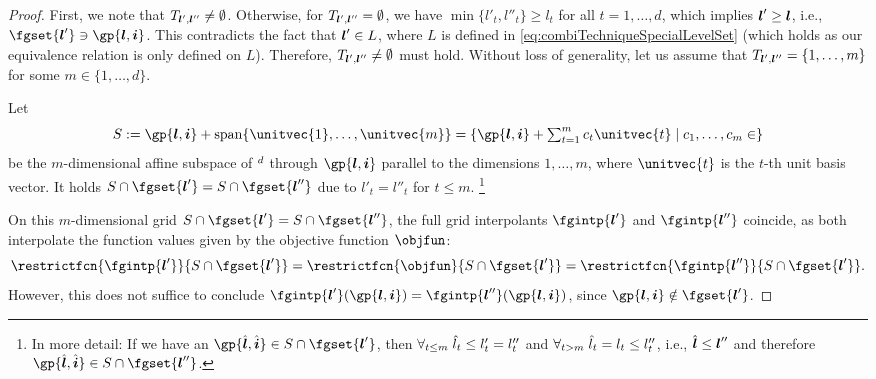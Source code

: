 \begin{proof}
  First, we note that $T_{{\boldsymbol{l}}',{\boldsymbol{l}}''} \not= \emptyset$.
  Otherwise, for $T_{{\boldsymbol{l}}',{\boldsymbol{l}}''} = \emptyset$,
  we have $\min\{l'_t, l''_t\} \ge l_t$
  for all $t = 1, \dotsc, d$, which implies ${\boldsymbol{l}}' \ge {\boldsymbol{l}}$, i.e.,
  $\fgset{\*l'} \ni \gp{\*l,\*i}$.
  This contradicts the fact that ${\boldsymbol{l}}' \in L$, where $L$ is defined
  in \eqref{eq:combiTechniqueSpecialLevelSet}
  (which holds as our equivalence relation is only defined on $L$).
  Therefore, $T_{{\boldsymbol{l}}',{\boldsymbol{l}}''} \not= \emptyset$ must hold.
  Without loss of generality,
  let us assume that $T_{{\boldsymbol{l}}',{\boldsymbol{l}}''} = \{1, \dotsc, m\}$
  for some $m \in \{1, \dotsc, d\}$.
  
  Let
  \begin{equation}
    S := \gp{\*l,\*i} + \spn\{\unitvec{1}, \dotsc, \unitvec{m}\}
    = \{\gp{\*l,\*i} + \textstyle\sum_{t=1}^m c_t \unitvec{t} \mid
    c_1, \dotsc, c_m \in \real\}
  \end{equation}
  be the $m$-dimensional affine subspace of $\real^d$
  through $\gp{\*l, \*i}$
  parallel to the dimensions $1, \dotsc, m$,
  where $\unitvec{t}$ is the $t$-th unit basis vector.
  It holds $S \cap \fgset{\*l'} = S \cap \fgset{\*l''}$ due to
  $l'_t = l''_t$ for $t \le m$.%
  \footnote{%
    In more detail:
    If we have an $\gp{\hat{\*l},\hat{\*i}} \in S \cap \fgset{\*l'}$,
    then $\forall_{t \le m}\;\hat{l}_t \le l'_t = l''_t$ and
    $\forall_{t > m}\;\hat{l}_t = l_t \le l''_t$, i.e.,
    $\hat{{\boldsymbol{l}}} \le {\boldsymbol{l}}''$ and therefore
    $\gp{\hat{\*l},\hat{\*i}} \in S \cap \fgset{\*l''}$.%
  }
  
  On this $m$-dimensional grid $S \cap \fgset{\*l'} = S \cap \fgset{\*l''}$,
  the full grid interpolants $\fgintp{\*l'}$ and $\fgintp{\*l''}$
  coincide, as both interpolate the function values given by
  the objective function $\objfun$:
  \begin{equation}
    \label{eq:proofCombiTechniqueIdenticalValues1}
    \restrictfcn{\fgintp{\*l'}}{S \cap \fgset{\*l'}}
    = \restrictfcn{\objfun}{S \cap \fgset{\*l'}}
    =  \restrictfcn{\fgintp{\*l''}}{S \cap \fgset{\*l'}}.
  \end{equation}
  However, this does not suffice to conclude
  $\fgintp{\*l'}(\gp{\*l,\*i}) = \fgintp{\*l''}(\gp{\*l,\*i})$,
  since $\gp{\*l,\*i} \notin \fgset{\*l'}$.
  

\end{proof}
